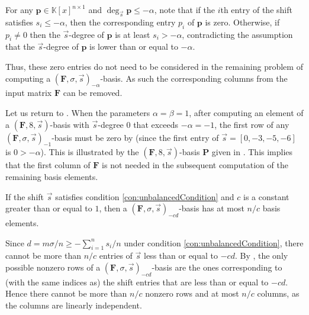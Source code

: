 \begin{pf}
For any $\mathbf{p}\in\mathbb{K}\left[x\right]^{n\times1}$ and $\deg_{\vec{s}}\mathbf{p}\le-\alpha$,
note that if the $i$th entry of the shift satisfies $s_{i}\le-\alpha$,
then the corresponding entry $p_{i}$ of $\mathbf{p}$ is zero. %
Otherwise, if $p_{i}\ne0$ then the $\vec{s}$-degree of $\mathbf{p}$
is at least $s_{i}>-\alpha$, contradicting the assumption that the
$\vec{s}$-degree of $\mathbf{p}$ is lower than or equal to $-\alpha$. 
\end{pf}
Thus, these zero entries do not need to be considered in the remaining
problem of computing a $\left(\mathbf{F},\sigma,\vec{s}\right)_{-\alpha}$-basis.
As such the corresponding columns from the input matrix $\mathbf{F}$
can be removed. 
\begin{exmp}
Let us return to . When the parameters
$\alpha=\beta=1$, after computing an element of a $(\mathbf{F},8,\vec{s})$-basis
with $\vec{s}$-degree $0$ that exceeds $-\alpha=-1$, the first
row of any $\left(\mathbf{F},\sigma,\vec{s}\right)_{-1}$-basis must
be zero by  (since the first
entry of $\vec{s}=[0,-3,-5,-6]$ is $0>-\alpha$). This is illustrated
by the $(\mathbf{F},8,\vec{s})$-basis $\mathbf{P}$ given in .
This implies that the first column of $\mathbf{F}$ is not needed
in the subsequent computation of the remaining basis elements.\end{exmp}
\begin{cor}
\label{cor:numberBasisElements}If the shift $\vec{s}$ satisfies
condition \eqref{con:unbalancedCondition} and $c$ is a constant
greater than or equal to $1$, then a $\left(\mathbf{F},\sigma,\vec{s}\right)_{-cd}$-basis
has at most $n/c$ basis elements.\end{cor}
\begin{pf}
Since $d=m\sigma/n\ge-\sum_{i=1}^{n}s_{i}/n$ under condition \eqref{con:unbalancedCondition},
there cannot be more than $n/c$ entries of $\vec{s}$ less than or
equal to $-cd$. By , the only
possible nonzero rows of a $\left(\mathbf{F},\sigma,\vec{s}\right)_{-cd}$-basis
are the ones corresponding to (with the same indices as) the shift
entries that are less than or equal to $-cd$. Hence there cannot
be more than $n/c$ nonzero rows and at most $n/c$ columns, as the
columns are linearly independent. 
\end{pf}
